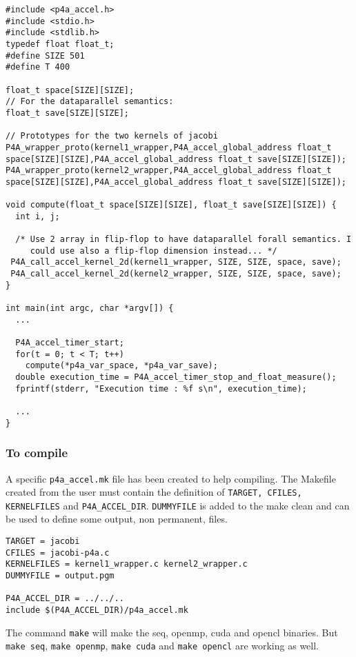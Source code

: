 \documentclass[a4paper]{article}
\begin{document}
\begin{lstlisting}
#include <p4a_accel.h>
#include <stdio.h>
#include <stdlib.h>
typedef float float_t;
#define SIZE 501
#define T 400

float_t space[SIZE][SIZE];
// For the dataparallel semantics:
float_t save[SIZE][SIZE];

// Prototypes for the two kernels of jacobi
P4A_wrapper_proto(kernel1_wrapper,P4A_accel_global_address float_t space[SIZE][SIZE],P4A_accel_global_address float_t save[SIZE][SIZE]);
P4A_wrapper_proto(kernel2_wrapper,P4A_accel_global_address float_t space[SIZE][SIZE],P4A_accel_global_address float_t save[SIZE][SIZE]);

void compute(float_t space[SIZE][SIZE], float_t save[SIZE][SIZE]) {
  int i, j;

  /* Use 2 array in flip-flop to have dataparallel forall semantics. I
     could use also a flip-flop dimension instead... */
 P4A_call_accel_kernel_2d(kernel1_wrapper, SIZE, SIZE, space, save);
 P4A_call_accel_kernel_2d(kernel2_wrapper, SIZE, SIZE, space, save);
}

int main(int argc, char *argv[]) {
  ...

  P4A_accel_timer_start;
  for(t = 0; t < T; t++)
    compute(*p4a_var_space, *p4a_var_save);
  double execution_time = P4A_accel_timer_stop_and_float_measure();
  fprintf(stderr, "Execution time : %f s\n", execution_time);

  ...
}

\end{lstlisting}

\subsubsection{To compile}

A specific \texttt{p4a\_accel.mk} file has been created to help
compiling. The Makefile created from the user must contain the
definition of \texttt{TARGET, CFILES, KERNELFILES} and
\texttt{P4A\_ACCEL\_DIR}.  \texttt{DUMMYFILE} is added to the make
clean and can be used to define some output, non permanent, files.

\begin{lstlisting}
TARGET = jacobi
CFILES = jacobi-p4a.c
KERNELFILES = kernel1_wrapper.c kernel2_wrapper.c
DUMMYFILE = output.pgm

P4A_ACCEL_DIR = ../../..
include $(P4A_ACCEL_DIR)/p4a_accel.mk
\end{lstlisting}

The command \texttt{make} will make the seq, openmp, cuda and opencl binaries.
But \texttt{make seq}, \texttt{make openmp}, \texttt{make cuda} and \texttt{make opencl} are working as well.
\end{document}
